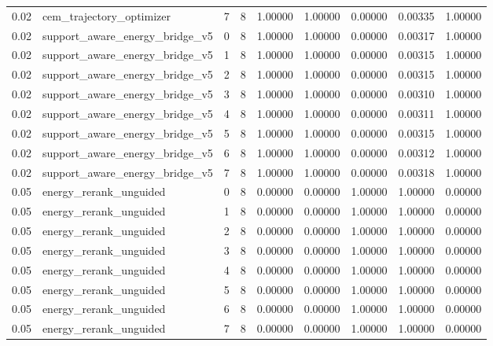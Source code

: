 \documentclass{article}
\begin{document}
\begin{table}[tbp]
{\begin{tabular}{lllllllll}
0.02 & cem\_trajectory\_optimizer & 7 & 8 & 1.00000 & 1.00000 & 0.00000 & 0.00335 & 1.00000 \\
0.02 & support\_aware\_energy\_bridge\_v5 & 0 & 8 & 1.00000 & 1.00000 & 0.00000 & 0.00317 & 1.00000 \\
0.02 & support\_aware\_energy\_bridge\_v5 & 1 & 8 & 1.00000 & 1.00000 & 0.00000 & 0.00315 & 1.00000 \\
0.02 & support\_aware\_energy\_bridge\_v5 & 2 & 8 & 1.00000 & 1.00000 & 0.00000 & 0.00315 & 1.00000 \\
0.02 & support\_aware\_energy\_bridge\_v5 & 3 & 8 & 1.00000 & 1.00000 & 0.00000 & 0.00310 & 1.00000 \\
0.02 & support\_aware\_energy\_bridge\_v5 & 4 & 8 & 1.00000 & 1.00000 & 0.00000 & 0.00311 & 1.00000 \\
0.02 & support\_aware\_energy\_bridge\_v5 & 5 & 8 & 1.00000 & 1.00000 & 0.00000 & 0.00315 & 1.00000 \\
0.02 & support\_aware\_energy\_bridge\_v5 & 6 & 8 & 1.00000 & 1.00000 & 0.00000 & 0.00312 & 1.00000 \\
0.02 & support\_aware\_energy\_bridge\_v5 & 7 & 8 & 1.00000 & 1.00000 & 0.00000 & 0.00318 & 1.00000 \\
0.05 & energy\_rerank\_unguided & 0 & 8 & 0.00000 & 0.00000 & 1.00000 & 1.00000 & 0.00000 \\
0.05 & energy\_rerank\_unguided & 1 & 8 & 0.00000 & 0.00000 & 1.00000 & 1.00000 & 0.00000 \\
0.05 & energy\_rerank\_unguided & 2 & 8 & 0.00000 & 0.00000 & 1.00000 & 1.00000 & 0.00000 \\
0.05 & energy\_rerank\_unguided & 3 & 8 & 0.00000 & 0.00000 & 1.00000 & 1.00000 & 0.00000 \\
0.05 & energy\_rerank\_unguided & 4 & 8 & 0.00000 & 0.00000 & 1.00000 & 1.00000 & 0.00000 \\
0.05 & energy\_rerank\_unguided & 5 & 8 & 0.00000 & 0.00000 & 1.00000 & 1.00000 & 0.00000 \\
0.05 & energy\_rerank\_unguided & 6 & 8 & 0.00000 & 0.00000 & 1.00000 & 1.00000 & 0.00000 \\
0.05 & energy\_rerank\_unguided & 7 & 8 & 0.00000 & 0.00000 & 1.00000 & 1.00000 & 0.00000 \\
\bottomrule
\end{tabular}
}
\end{table}

\clearpage
\end{document}
